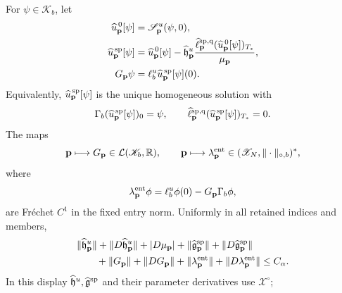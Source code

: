 \begin{theorem}
For \(\psi\in\mathscr K_b\), let
\begin{align}
 \widehat u_{\mathbf p}^{\,0}[\psi]
 &=\mathscr S_{\mathbf p}^{u}(\psi,0),\notag\\
 \widehat u_{\mathbf p}^{\,\rm sp}[\psi]
 &=\widehat u_{\mathbf p}^{\,0}[\psi]
 -\widehat{\mathfrak h}_{\mathbf p}^{u}
   \frac{\widehat\ell_{\mathbf p}^{\rm sp,q}
       (\widehat u_{\mathbf p}^{\,0}[\psi])_{T_*}}
        {\mu_{\mathbf p}},                     \label{eq:oe-C1-physical-row-kernel-solution}\\
 G_{\mathbf p}\psi
 &=\ell_b^u\widehat u_{\mathbf p}^{\,\rm sp}[\psi](0).
                                                        \label{eq:oe-C1-entry-graph-map}
\end{align}
Equivalently, \(\widehat u_{\mathbf p}^{\,\rm sp}[\psi]\) is the unique
homogeneous solution with
\begin{equation}
 \Gamma_b(\widehat u_{\mathbf p}^{\,\rm sp}[\psi])_0=\psi,
 \qquad
 \widehat\ell_{\mathbf p}^{\rm sp,q}
       (\widehat u_{\mathbf p}^{\,\rm sp}[\psi])_{T_*}=0. \label{eq:oe-C1-physical-bordered-data}
\end{equation}
The maps
\begin{equation}
 \mathbf p\longmapsto
 G_{\mathbf p}\in\mathcal L(\mathscr K_b,\mathbb R),
 \qquad
 \mathbf p\longmapsto\lambda_{\mathbf p}^{\rm ent}
 \in(\mathscr X_N,\|\cdot\|_{\circ,b})^*,
                                                        \label{eq:oe-C1-entry-conormal-maps}
\end{equation}
where
\begin{equation}
 \lambda_{\mathbf p}^{\rm ent}\phi
 =\ell_b^u\phi(0)-G_{\mathbf p}\Gamma_b\phi,    \label{eq:oe-C1-entry-conormal}
\end{equation}
are Fr\'echet \(C^1\) in the fixed entry norm.  Uniformly in all
retained indices and members,
\begin{align}
 &\|\widehat{\mathfrak h}_{\mathbf p}^{u}\|
 +\|D\widehat{\mathfrak h}_{\mathbf p}^{u}\|
 +|D\mu_{\mathbf p}|
 +\|\widehat{\mathfrak g}_{\mathbf p}^{\rm sp}\|
 +\|D\widehat{\mathfrak g}_{\mathbf p}^{\rm sp}\|\notag\\
 &\qquad
 +\|G_{\mathbf p}\|+\|DG_{\mathbf p}\|
 +\|\lambda_{\mathbf p}^{\rm ent}\|
 +\|D\lambda_{\mathbf p}^{\rm ent}\|
 \le C_\alpha.                                 \label{eq:oe-C1-all-object-bound}
\end{align}
In this display
\(\widehat{\mathfrak h}^u,\widehat{\mathfrak g}^{\rm sp}\) and their
parameter derivatives use \(\mathcal X^\circ\);

\end{theorem}
